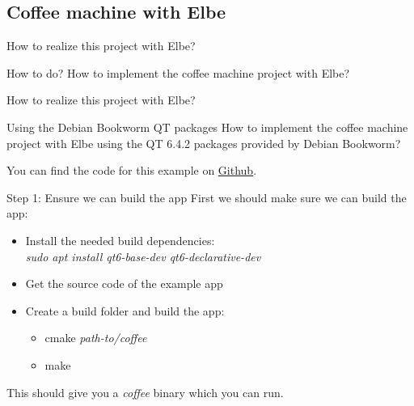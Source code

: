 \documentclass{beamer}
\begin{document}
\subsection{Coffee machine with Elbe}

\begin{frame}{How to realize this project with Elbe?}
	\begin{block}{How to do?}
		How to implement the coffee machine project with Elbe?
	\end{block}
\end{frame}

\begin{frame}{How to realize this project with Elbe?}
	\begin{block}{Using the Debian Bookworm QT packages}
		How to implement the coffee machine project with Elbe using the QT 6.4.2 packages provided by Debian Bookworm?
	\end{block}

	You can find the code for this example on
	\href{https://github.com/tomirgang/eh21_maintainable_linux/tree/main/examples/elbe_advanced}{Github}.
\end{frame}


\begin{frame}{Step 1: Ensure we can build the app}
	First we should make sure we can build the app:
	\begin{itemize}
		\item Install the needed build dependencies:\\
			\emph{sudo apt install qt6-base-dev qt6-declarative-dev}
		\item Get the source code of the example app
		\item Create a build folder and build the app:
		\begin{itemize}
			\item cmake \emph{path-to/coffee}
			\item make
		\end{itemize}
	\end{itemize}
	This should give you a \emph{coffee} binary which you can run.
\end{frame}
\end{document}

